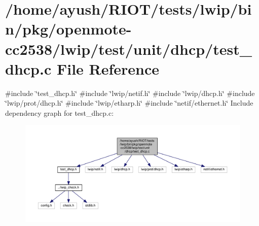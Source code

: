 \hypertarget{openmote-cc2538_2lwip_2test_2unit_2dhcp_2test__dhcp_8c}{}\section{/home/ayush/\+R\+I\+O\+T/tests/lwip/bin/pkg/openmote-\/cc2538/lwip/test/unit/dhcp/test\+\_\+dhcp.c File Reference}
\label{openmote-cc2538_2lwip_2test_2unit_2dhcp_2test__dhcp_8c}
{\ttfamily \#include \char`\"{}test\+\_\+dhcp.\+h\char`\"{}}\newline
{\ttfamily \#include \char`\"{}lwip/netif.\+h\char`\"{}}\newline
{\ttfamily \#include \char`\"{}lwip/dhcp.\+h\char`\"{}}\newline
{\ttfamily \#include \char`\"{}lwip/prot/dhcp.\+h\char`\"{}}\newline
{\ttfamily \#include \char`\"{}lwip/etharp.\+h\char`\"{}}\newline
{\ttfamily \#include \char`\"{}netif/ethernet.\+h\char`\"{}}\newline
Include dependency graph for test\+\_\+dhcp.\+c\+:
\nopagebreak
\begin{figure}[H]
\begin{center}
\leavevmode
\includegraphics[width=350pt]{openmote-cc2538_2lwip_2test_2unit_2dhcp_2test__dhcp_8c__incl}
\end{center}
\end{figure}
